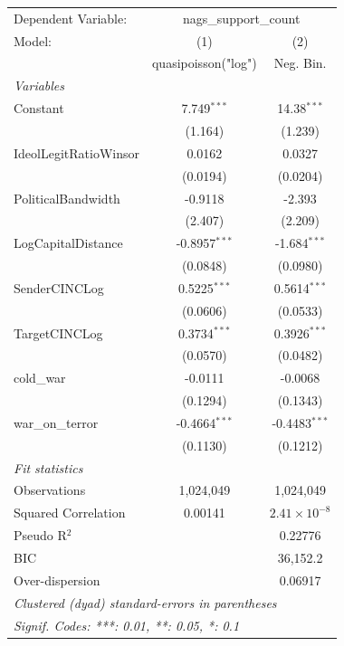 
\begingroup
\centering
\begin{tabular}{lcc}
   \tabularnewline \midrule \midrule
   Dependent Variable: & \multicolumn{2}{c}{nags\_support\_count}\\
   Model:                & (1)                  & (2)\\  
                         &  quasipoisson("log") & Neg. Bin.\\  
   \midrule
   \emph{Variables}\\
   Constant              & 7.749$^{***}$        & 14.38$^{***}$\\   
                         & (1.164)              & (1.239)\\   
   IdeolLegitRatioWinsor & 0.0162               & 0.0327\\   
                         & (0.0194)             & (0.0204)\\   
   PoliticalBandwidth    & -0.9118              & -2.393\\   
                         & (2.407)              & (2.209)\\   
   LogCapitalDistance    & -0.8957$^{***}$      & -1.684$^{***}$\\   
                         & (0.0848)             & (0.0980)\\   
   SenderCINCLog         & 0.5225$^{***}$       & 0.5614$^{***}$\\   
                         & (0.0606)             & (0.0533)\\   
   TargetCINCLog         & 0.3734$^{***}$       & 0.3926$^{***}$\\   
                         & (0.0570)             & (0.0482)\\   
   cold\_war             & -0.0111              & -0.0068\\   
                         & (0.1294)             & (0.1343)\\   
   war\_on\_terror       & -0.4664$^{***}$      & -0.4483$^{***}$\\   
                         & (0.1130)             & (0.1212)\\   
   \midrule
   \emph{Fit statistics}\\
   Observations          & 1,024,049            & 1,024,049\\  
   Squared Correlation   & 0.00141              & $2.41\times 10^{-8}$\\   
   Pseudo R$^2$          &                      & 0.22776\\  
   BIC                   &                      & 36,152.2\\  
   Over-dispersion       &                      & 0.06917\\  
   \midrule \midrule
   \multicolumn{3}{l}{\emph{Clustered (dyad) standard-errors in parentheses}}\\
   \multicolumn{3}{l}{\emph{Signif. Codes: ***: 0.01, **: 0.05, *: 0.1}}\\
\end{tabular}
\par\endgroup


